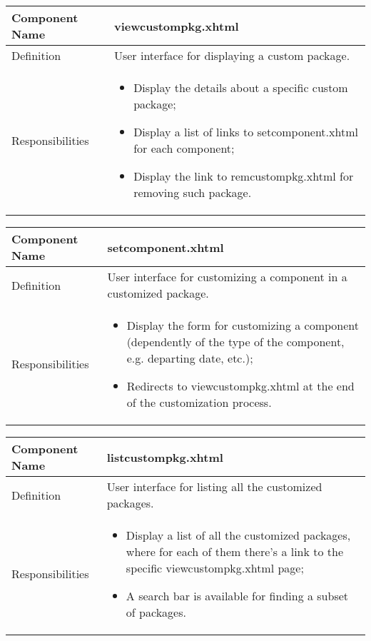 \documentclass[a4paper,12pt]{book}
\begin{document}
\begin{center}
  \begin{tabular}{ | p{3.3cm} | p{11.7cm} | }
    \hline
    Component Name & \textbf{viewcustompkg.xhtml} \\ \hline
    Definition & User interface for displaying a custom package. \\ \hline
    Responsibilities & \parbox{0.65\textwidth}{
      \begin{itemize}[noitemsep,leftmargin=*]
        \item Display the details about a specific custom package;
        \item Display a list of links to setcomponent.xhtml for each component;
        \item Display the link to remcustompkg.xhtml for removing such package.
      \end{itemize}} \\ \hline
    \end{tabular}
  \end{center}
  \begin{center}
    \begin{tabular}{ | p{3.3cm} | p{11.7cm} | }
      \hline
      Component Name & \textbf{setcomponent.xhtml} \\ \hline
      Definition & User interface for customizing a component in a customized package. \\ \hline
      Responsibilities & \parbox{0.65\textwidth}{
        \begin{itemize}[noitemsep,leftmargin=*]
          \item Display the form for customizing a component (dependently of the type of the component, e.g. departing date, etc.);
          \item Redirects to viewcustompkg.xhtml at the end of the customization process.
        \end{itemize}} \\ \hline
      \end{tabular}
    \end{center}
    \begin{center}
      \begin{tabular}{ | p{3.3cm} | p{11.7cm} | }
        \hline
        Component Name & \textbf{listcustompkg.xhtml} \\ \hline
        Definition & User interface for listing all the customized packages. \\ \hline
        Responsibilities & \parbox{0.65\textwidth}{
          \begin{itemize}[noitemsep,leftmargin=*]
            \item Display a list of all the customized packages, where for each of them there's a link to the specific viewcustompkg.xhtml page;
            \item A search bar is available for finding a subset of packages.
          \end{itemize}} \\ \hline
        \end{tabular}
      \end{center}
\end{document}
